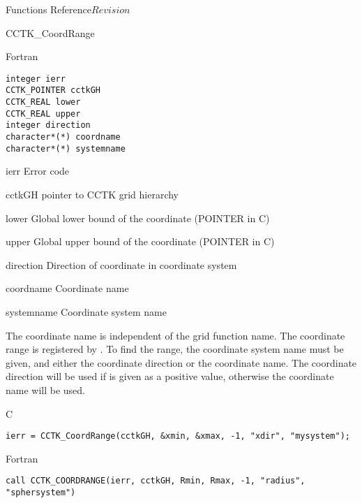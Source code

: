 \begin{cactuspart}{ Functions Reference}{}{$Revision$}
\begin{FunctionDescription}{CCTK\_CoordRange}
\begin{SynopsisSection}
\begin{Synopsis}{Fortran}
\begin{verbatim}
integer ierr
CCTK_POINTER cctkGH
CCTK_REAL lower
CCTK_REAL upper
integer direction
character*(*) coordname
character*(*) systemname \end{verbatim}
\end{Synopsis}
\end{SynopsisSection}
\begin{ParameterSection}
\begin{Parameter}{ierr}
Error code
\end{Parameter}
\begin{Parameter}{cctkGH}
pointer to CCTK grid hierarchy
\end{Parameter}
\begin{Parameter}{lower}
Global lower bound of the coordinate (POINTER in C)
\end{Parameter}
\begin{Parameter}{upper}
Global upper bound of the coordinate (POINTER in C)
\end{Parameter}
\begin{Parameter}{direction}
Direction of coordinate in coordinate system
\end{Parameter}
\begin{Parameter}{coordname}
Coordinate name
\end{Parameter}
\begin{Parameter}{systemname}
Coordinate system name
\end{Parameter}
\end{ParameterSection}
\begin{Discussion}
The coordinate name is independent of the grid function name.
The coordinate range is registered by .
To find the range, the coordinate system name must be given, and either
the coordinate direction or the coordinate name. The coordinate direction
will be used if is given as a positive value, otherwise the coordinate
name will be used.
\end{Discussion}
\begin{ExampleSection}
\begin{Example}{C}
\begin{verbatim}
ierr = CCTK_CoordRange(cctkGH, &xmin, &xmax, -1, "xdir", "mysystem");
\end{verbatim}
\end{Example}
\begin{Example}{Fortran}
\begin{verbatim}
call CCTK_COORDRANGE(ierr, cctkGH, Rmin, Rmax, -1, "radius", "sphersystem")
\end{verbatim}
\end{Example}
\end{ExampleSection}
\end{FunctionDescription}


\end{cactuspart}
